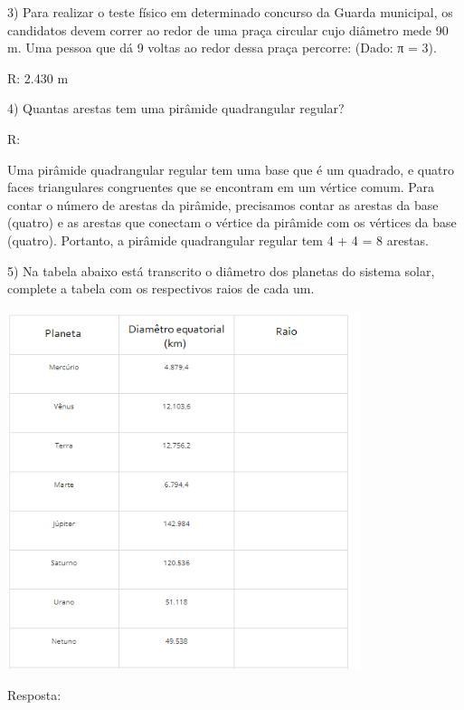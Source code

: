 3) Para realizar o teste físico em determinado concurso da Guarda
municipal, os candidatos devem correr ao redor de uma praça circular
cujo diâmetro mede 90 m. Uma pessoa que dá 9 voltas ao redor dessa praça
percorre: (Dado: π = 3).

R: 2.430 m

4) Quantas arestas tem uma pirâmide quadrangular regular?

R:

Uma pirâmide quadrangular regular tem uma base que é um quadrado, e
quatro faces triangulares congruentes que se encontram em um vértice
comum. Para contar o número de arestas da pirâmide, precisamos contar as
arestas da base (quatro) e as arestas que conectam o vértice da pirâmide
com os vértices da base (quatro). Portanto, a pirâmide quadrangular
regular tem 4 + 4 = 8 arestas.

5) Na tabela abaixo está transcrito o diâmetro dos planetas do sistema
solar, complete a tabela com os respectivos raios de cada um.

\includegraphics[width=4.05833in,height=4.13212in]{./imgSAEB_6_MAT/media/image48.png}

Resposta:

